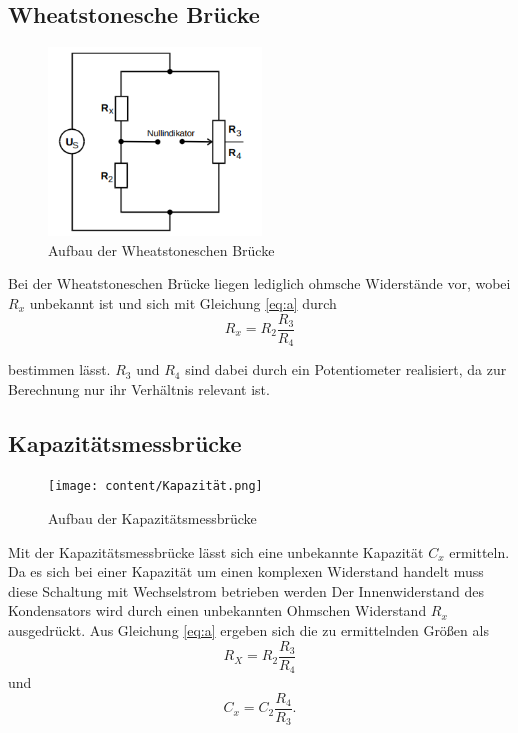 \subsection{Wheatstonesche Brücke}
\begin{figure}[H]
\centering
    \includegraphics[height= 5cm]{content/Wheatstone.png}
    \caption{Aufbau der Wheatstoneschen Brücke\cite[219]{sample}}
\end{figure}
\noindent Bei der Wheatstoneschen Brücke liegen lediglich ohmsche Widerstände vor, wobei $R_x$ unbekannt
ist und sich mit Gleichung \ref{eq:a} durch
\begin{equation}
    R_x=R_2\frac{R_3}{R_4}
    \label{eq:1}
\end{equation}

\noindent bestimmen lässt. $R_3$ und $R_4$ sind dabei
durch ein Potentiometer realisiert, da zur Berechnung
nur ihr Verhältnis relevant ist.


\subsection{Kapazitätsmessbrücke}
\label{sec:Kap}
\begin{figure}[H]
\centering
    \texttt{[image: content/Kapazität.png]}
    \caption{Aufbau der Kapazitätsmessbrücke\cite[220]{sample}}
\end{figure}
\noindent Mit der Kapazitätsmessbrücke lässt sich eine
unbekannte Kapazität $C_x$ ermitteln. Da es sich
bei einer Kapazität um einen komplexen Widerstand handelt
muss diese Schaltung mit Wechselstrom betrieben werden
Der Innenwiderstand des Kondensators wird durch einen
unbekannten Ohmschen Widerstand $R_x$ ausgedrückt.
Aus Gleichung \ref{eq:a} ergeben sich die zu ermittelnden
Größen als
\begin{equation}
    R_X=R_2\frac{R_3}{R_4}
    \label{eq:3}
\end{equation}
\noindent und
\begin{equation}
    C_x=C_2\frac{R_4}{R_3}.
    \label{eq:4}
\end{equation}




